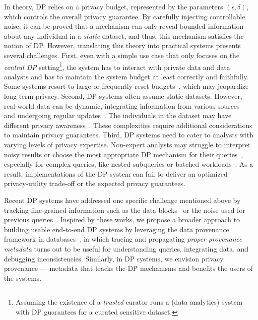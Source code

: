 In theory, DP relies on a privacy budget, represented by the parameters $(\epsilon,\delta)$, which controls the overall privacy guarantee. By carefully injecting controllable noise, it can be proved that a mechanism can only reveal bounded information about any individual in a \textit{static} dataset, and thus, this mechanism satisfies the notion of DP. However, translating this theory into practical systems presents several challenges. 
First, even with a simple use case that only focuses on the \emph{central DP} setting\footnote{Assuming the existence of a \emph{trusted} curator runs a (data analytics) system with DP guarantees for a curated sensitive dataset.}, the system has to interact with private data and data analysts and has to maintain the system budget at least correctly and faithfully. 
Some systems resort to large or frequently reset budgets~\cite{rogers2020linkedin,amazon_DP}, which may jeopardize long-term privacy. Second, DP systems often assume static datasets. However, real-world data can be dynamic, integrating information from various sources~\cite{nicolas2023cohere} and undergoing regular updates~\cite{growingdb18}. The individuals in the dataset may have different privacy awareness~\cite{jorgensen2015personalized}.
These complexities require additional considerations to maintain privacy guarantees. Third, DP systems need to cater to analysts with varying levels of privacy expertise. Non-expert analysts may struggle to interpret noisy results or choose the most appropriate DP mechanism for their queries~\cite{ge2019apex}, especially for complex queries, like nested subqueries or batched workloads~\cite{nissim2007smooth,dong2021residual}. As a result, implementations of the DP system can fail to deliver an optimized privacy-utility trade-off or the expected privacy guarantees.


Recent DP systems have addressed one specific challenge mentioned above by tracking fine-grained information such as the data blocks~\cite{LecuyerSVG019sage,nicolas2023cohere} or the noise used for previous queries~\cite{mazmudar2022cache,zhang2022DProvSQL}. 
Inspired by these works, we propose a broader approach to building usable end-to-end DP systems by leveraging the data provenance framework in databases~\cite{cheney2009provenance}, in which tracing and propagating \textit{proper provenance metadata} turns out to be useful for understanding queries, integrating data, and debugging inconsistencies. Similarly, in DP systems, we envision privacy provenance --- metadata that tracks the DP mechanisms and benefits the users of the systems. 
 
